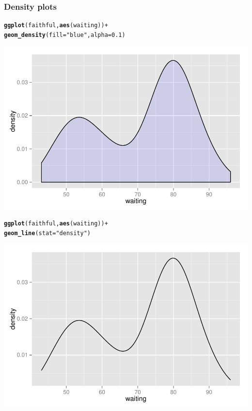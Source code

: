 \documentclass{beamer}\usepackage[]{graphicx}\usepackage[]{color}
\makeatletter
\newcommand{\hlnum}[1]{\textcolor[rgb]{0.686,0.059,0.569}{#1}}%
\newcommand{\hlstr}[1]{\textcolor[rgb]{0.192,0.494,0.8}{#1}}%
\newcommand{\hlopt}[1]{\textcolor[rgb]{0,0,0}{#1}}%
\newcommand{\hlstd}[1]{\textcolor[rgb]{0.345,0.345,0.345}{#1}}%
\newcommand{\hlkwc}[1]{\textcolor[rgb]{0.333,0.667,0.333}{#1}}%
\newcommand{\hlkwd}[1]{\textcolor[rgb]{0.737,0.353,0.396}{\textbf{#1}}}%
\newenvironment{kframe}{%
 \def\at@end@of@kframe{}%
 \ifinner\ifhmode%
  \def\at@end@of@kframe{\end{minipage}}%
  \begin{minipage}{\columnwidth}%
 \fi\fi%
 \def\FrameCommand##1{\hskip\@totalleftmargin \hskip-\fboxsep
 \colorbox{shadecolor}{##1}\hskip-\fboxsep
     \hskip-\linewidth \hskip-\@totalleftmargin \hskip\columnwidth}%
 \MakeFramed {\advance\hsize-\width
   \@totalleftmargin\z@ \linewidth\hsize
   \@setminipage}}%
 {\par\unskip\endMakeFramed%
 \at@end@of@kframe}
\newenvironment{knitrout}{}{} %
\makeatother
\begin{document}
\begin{frame}[fragile]
\frametitle{Density plots}
\begin{knitrout}\footnotesize
{}\color{fgcolor}\begin{kframe}
\begin{alltt}
\hlkwd{ggplot}\hlstd{(faithful,} \hlkwd{aes}\hlstd{(waiting))} \hlopt{+}
    \hlkwd{geom_density}\hlstd{(}\hlkwc{fill} \hlstd{=} \hlstr{"blue"}\hlstd{,} \hlkwc{alpha} \hlstd{=} \hlnum{0.1}\hlstd{)}
\end{alltt}
\end{kframe}

{\centering \includegraphics[width=.75\linewidth]{figure/densityonefove_} 

}



\end{knitrout}
\end{frame}


\begin{frame}[fragile]
\begin{knitrout}\footnotesize
{}\color{fgcolor}\begin{kframe}
\begin{alltt}
\hlkwd{ggplot}\hlstd{(faithful,} \hlkwd{aes}\hlstd{(waiting))} \hlopt{+}
    \hlkwd{geom_line}\hlstd{(}\hlkwc{stat} \hlstd{=} \hlstr{"density"}\hlstd{)}
\end{alltt}
\end{kframe}

{\centering \includegraphics[width=.75\linewidth]{figure/densitytwo___} 

}



\end{knitrout}
\end{frame}
\end{document}
